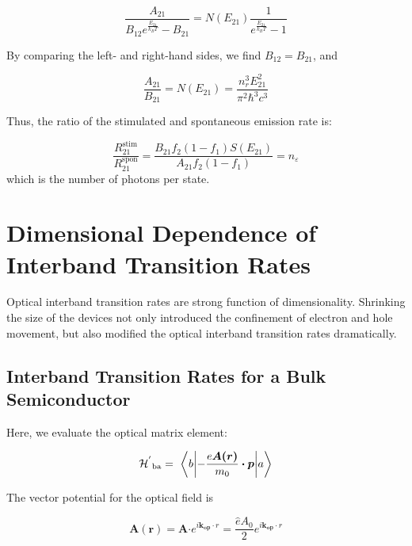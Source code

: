 \begin{equation}
\frac{A_{21}}{{B_{12}e}^{\frac{E_{21}}{k_{B}T}} - B_{21}} = N\left( E_{21} \right)\frac{1}{e^{\frac{E_{21}}{k_{B}T}} - 1}
\end{equation}

By comparing the left- and right-hand sides, we find \(B_{12} = B_{21}\), and

\begin{equation}
  \frac{A_{21}}{B_{21}} = N\left( E_{21} \right) = \frac{n_{r}^{3}E_{21}^{2}}{\pi^{2}\hbar^{3}c^{3}}
\end{equation}

Thus, the ratio of the stimulated and spontaneous emission rate is:

\begin{equation}
  \frac{R_{21}^{\text{stim}}}{R_{21}^{\text{spon}}} = \frac{B_{21}f_{2}\left( 1 - f_{1} \right)S\left( E_{21} \right)}{A_{21}f_{2}(1 - f_{1})} = n_{\varepsilon}
  \label{eq:sponstiratio}
\end{equation}
which is the number of photons per state.

\section[Interband Transition Rates]{Dimensional Dependence of Interband Transition Rates}\label{ITR}

Optical interband transition rates are strong function of dimensionality.
Shrinking the size of the devices not only introduced the confinement of
electron and hole movement, but also modified the optical interband transition
rates dramatically. 

\subsection{Interband Transition Rates for a Bulk Semiconductor} \label{3DTR}

Here, we evaluate the optical matrix element:

\begin{equation}
{\HAM^{'}}_{\text{ba}} = \bm{\ }\left\langle b \middle| - \frac{e\bm{A(r)}}{m_{0}}\bm{\cdot p} \middle| a \right\rangle
\end{equation}

The vector potential for the optical field is

\begin{equation}
\bm{A}\left( \bm{r} \right)\bm{= A}{\cdot e}^{i\bm{k}_{\bm{\text{op}}} \cdot r} = \frac{\hat{e}A_{0}}{2}e^{i\bm{k}_{\bm{\text{op}}} \cdot r}
\end{equation}

